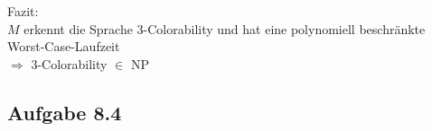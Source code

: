 Fazit:\\
$M$ erkennt die Sprache 3-Colorability und hat eine polynomiell beschränkte Worst-Case-Laufzeit\\
$\Rightarrow$ 3-Colorability $\in$ NP


\subsection*{Aufgabe 8.4}





